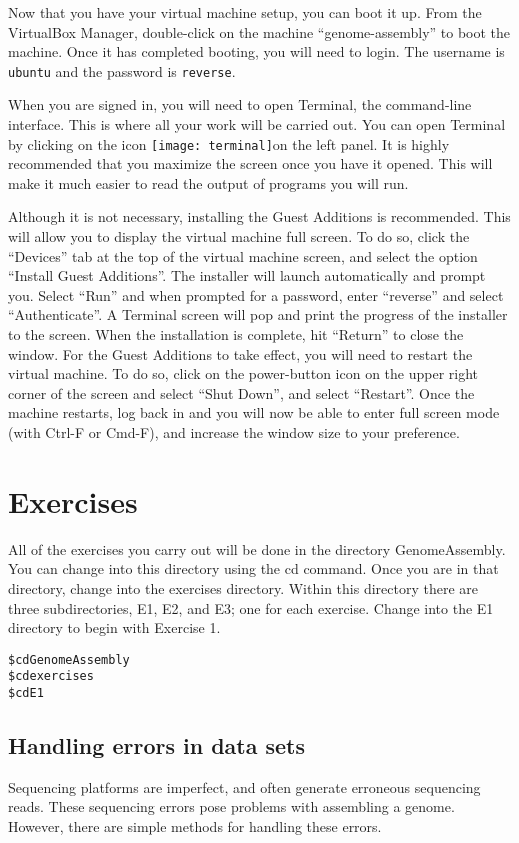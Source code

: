 \documentclass[11pt,a4paper]{scrartcl}
\newcommand{\termicon}{\texttt{[image: terminal]}\thinspace}
\begin{document}
Now that you have your virtual machine setup, you can boot it up. From the
VirtualBox Manager, double-click on the machine ``genome-assembly'' to boot the
machine.  Once it has completed booting, you will need to login. The username
is \texttt{ubuntu} and the password is \texttt{reverse}. 

When you are signed in, you will need to open Terminal, the command-line
interface. This is where all your work will be carried out. You can open
Terminal by clicking on the icon \termicon               on the left panel. It is highly recommended
that you maximize the screen once you have it opened. This will make it much
easier to read the output of programs you will run. 

Although it is not necessary, installing the Guest Additions is recommended.
This will allow you to display the virtual machine full screen. To do so, click
the ``Devices'' tab at the top of the virtual machine screen, and select the
option ``Install Guest Additions''. The installer will launch automatically and
prompt you. Select ``Run'' and when prompted for a password, enter ``reverse'' and
select ``Authenticate''. A Terminal screen will pop and print the progress of the
installer to the screen. When the installation is complete, hit “Return” to
close the window. For the Guest Additions to take effect, you will need to
restart the virtual machine. To do so, click on the power-button icon on the
upper right corner of the screen and select ``Shut Down'', and select ``Restart''.
Once the machine restarts, log back in and you will now be able to enter full
screen mode (with Ctrl-F or Cmd-F), and increase the window size to your
preference. 

\section*{Exercises}
All of the exercises you carry out will be done in the directory
GenomeAssembly. You can change into this directory using the cd command. Once
you are in that directory, change into the exercises directory. Within this
directory there are three subdirectories, E1, E2, and E3; one for each
exercise. Change into the E1 directory to begin with Exercise 1.

\begin{alltt}
    \$ cd GenomeAssembly
    \$ cd exercises
    \$ cd E1
\end{alltt}

\subsection{Handling errors in data sets}
Sequencing platforms are imperfect, and often generate erroneous sequencing
reads. These sequencing errors pose problems with assembling a genome. However,
there are simple methods for handling these errors. 
\end{document}
